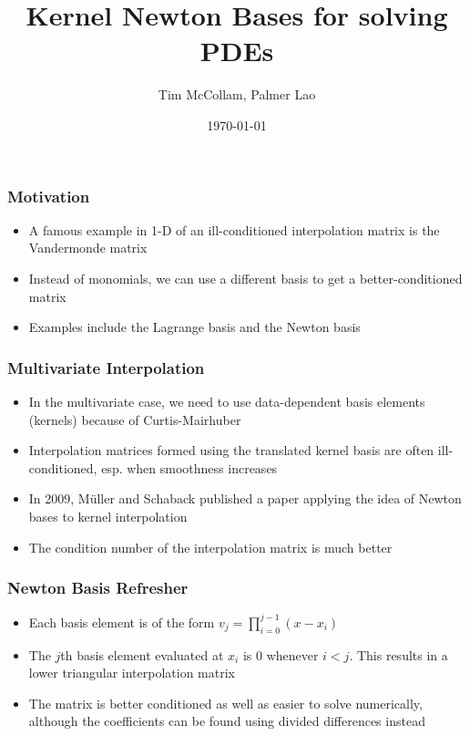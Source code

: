 \documentclass{beamer}
\title[Newton Bases and PDEs]{Kernel Newton Bases for solving PDEs} %
\author{Tim McCollam, Palmer Lao} %
\institute[IIT, CU] %
{
Illinois Institute of Technology, Clarkson University \\ %
\medskip
\textit{tmccolla@hawk.iit.edu, laopa@clarkson.edu} %
}
\date{\today} %
\begin{document}
\begin{frame}
\titlepage %
\end{frame}



\begin{frame}
\frametitle{Motivation}
\begin{itemize}
\item A famous example in 1-D of an ill-conditioned interpolation matrix is the Vandermonde matrix
\item Instead of monomials, we can use a different basis to get a better-conditioned matrix
\item Examples include the Lagrange basis and the Newton basis
\end{itemize}
\end{frame}

\begin{frame}
\frametitle{Multivariate Interpolation}
\begin{itemize}
\item In the multivariate case, we need to use data-dependent basis elements (kernels) because of Curtis-Mairhuber
\item Interpolation matrices formed using the translated kernel basis are often ill-conditioned, esp. when smoothness increases
\item In 2009, Müller and Schaback published a paper applying the idea of Newton bases to kernel interpolation
\item The condition number of the interpolation matrix is much better
\end{itemize}
\end{frame}

\begin{frame}
\frametitle{Newton Basis Refresher}
\begin{itemize}
\item Each basis element is of the form $v_j = \prod_{i=0}^{j-1}(x-x_i)$
\item The $j$th basis element evaluated at $x_i$ is 0 whenever $i < j$. This results in a lower triangular interpolation matrix
\item The matrix is better conditioned as well as easier to solve numerically, although the coefficients can be found using divided differences instead
\end{itemize}
\end{frame}
\end{document}
